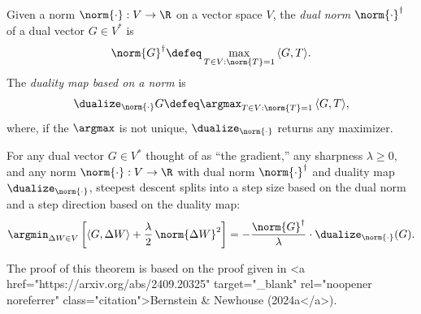 \begin{definitionbox}
    \label{def:dual-norm-and-duality-map}
    Given a norm $\norm{\cdot}:V\to\R$ on a vector space $V$, the \textit{dual norm} $\norm{\cdot}^\dagger$ of a dual vector $G \in V^\ast$ is
    \begin{equation*}
    \norm{G}^\dagger \defeq \max_{T\in V:\norm{T}=1} \, \langle G, T \rangle.
    \end{equation*}
    The \textit{duality map based on a norm} is
    \begin{equation*}
    \dualize_{\norm{\cdot}} G \defeq \argmax_{T\in V:\norm{T}=1} \, \langle G, T \rangle,
    \end{equation*}
    where, if the $\argmax$ is not unique, $\dualize_{\norm{\cdot}}$ returns any maximizer.
\end{definitionbox}

\begin{theorembox}
    \label{theorem:steepest}
    For any dual vector $G \in V^\ast$ thought of as “the gradient,” any sharpness $\lambda \geq 0$, and any norm $\norm{\cdot}: V \to \R$ with dual norm $\norm{\cdot}^\dagger$ and duality map $\dualize_{\norm{\cdot}}$, steepest descent splits into a step size based on the dual norm and a step direction based on the duality map:
\begin{gather*}\label{eq:dual-steepest}
    \argmin_{\Delta W \in V} \left[ \langle G, \Delta W \rangle + \frac{\lambda}{2} \, \norm{\Delta W}^2 \right] = - \frac{\norm{G}^\dagger}{\lambda} \cdot \dualize_{\norm{\cdot}} (G).
\end{gather*}
\end{theorembox}

The proof of this theorem is based on the proof given in <a href="https://arxiv.org/abs/2409.20325" target="_blank" rel="noopener noreferrer" class="citation">Bernstein & Newhouse (2024a</a>).

